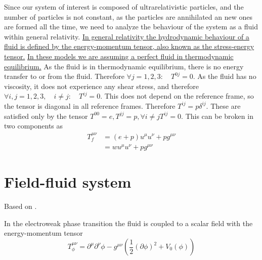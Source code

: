 Since our system of interest is composed of ultrarelativistic particles,
and the number of particles is not constant, as the particles are annihilated an new ones are formed all the time,
we need to analyze the behaviour of the system as a fluid within general relativity.
\href{https://en.wikipedia.org/wiki/Stress\%E2\%80\%93energy\_tensor\#Stress\%E2\%80\%93energy\_of\_a\_fluid\_in\_equilibrium}{
In general relativity the hydrodynamic behaviour of a fluid is defined by the energy-momentum tensor, also known as the stress-energy tensor.}
\href{https://physics.stackexchange.com/a/412067/298623}{In these models we are assuming a perfect fluid in thermodynamic equilibrium.}
As the fluid is in thermodynamic equilibrium, there is no energy transfer to or from the fluid.
Therefore
$\forall j=1,2,3: \quad T^{0j} = 0$.
As the fluid has no viscosity, it does not experience any shear stress, and therefore
$\forall i,j=1,2,3, \quad i \neq j: \quad T^{ij} = 0$.
This does not depend on the reference frame, so the tensor is diagonal in all reference frames.
Therefore $T^{ij} = p \delta^{ij}$.
These are satisfied only by the tensor $T^{00}=e, T^{jj}=p, \forall i \neq j T^{ij}=0$.
This can be broken in two components as
\cites[eq. 5.11, 5.23]{lecture_notes}[eq. 3]{giese_2020}[eq. 4]{giese_2021}
\begin{align}
T^{\mu \nu}_f
&= (e+p) u^\mu u^\nu + p g^{\mu \nu}
\label{eq:ep_tensor} \\
&= w u^\mu u^\nu + p g^{\mu \nu}
\end{align}


\section{Field-fluid system}
Based on \cite{moore_pt_1995}.

In the electroweak phase transition the fluid is coupled to a scalar field with the energy-momentum tensor
\cites[eq. 2.9]{hindmarsh_gw_pt_2019}
\begin{equation}
T_\phi^{\mu \nu}
= \partial^\mu \partial^\nu \phi
- g^{\mu \nu} \left(\frac{1}{2} (\partial \phi)^2 + V_0 (\phi) \right)
\end{equation}

